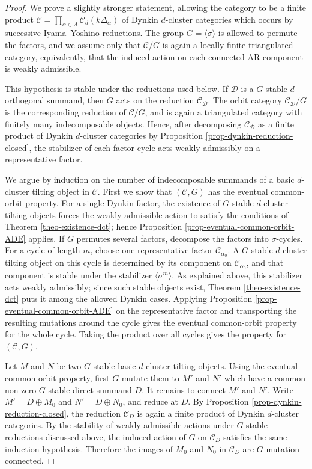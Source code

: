 \documentclass[12pt]{article}
\theoremstyle{plain}
\theoremstyle{definition}
\begin{document}
\begin{proof}
We prove a slightly stronger statement, allowing the category to be a finite
product \(\mathcal C=\prod_{\alpha\in A}\mathcal C_d(k\Delta_\alpha)\) of
Dynkin \(d\)-cluster categories which occurs by successive Iyama--Yoshino
reductions.  The group \(G=\langle\sigma\rangle\) is allowed to permute the
factors, and we assume only that \(\mathcal C/G\) is again a locally finite
triangulated category, equivalently, that the induced action on each connected
AR-component is weakly admissible.

This hypothesis is stable under the reductions used below.  If \(\mathcal D\)
is a \(G\)-stable \(d\)-orthogonal summand, then \(G\) acts on the reduction
\(\mathcal C_{\mathcal D}\).  The orbit category
\(\mathcal C_{\mathcal D}/G\) is the corresponding reduction of
\(\mathcal C/G\), and is again a triangulated category with finitely many
indecomposable objects.  Hence, after decomposing \(\mathcal C_{\mathcal D}\)
as a finite product of Dynkin \(d\)-cluster categories by Proposition
\ref{prop-dynkin-reduction-closed}, the stabilizer of each factor cycle acts
weakly admissibly on a representative factor. 

We argue by induction on the number of indecomposable summands of a basic
\(d\)-cluster tilting object in \(\mathcal C\).  First we show that
\((\mathcal C,G)\) has the eventual common-orbit property.  For a single Dynkin
factor, the existence of \(G\)-stable \(d\)-cluster tilting objects forces the
weakly admissible action to satisfy the conditions of Theorem
\ref{theo-existence-dct}; hence Proposition
\ref{prop-eventual-common-orbit-ADE} applies.  If \(G\) permutes several
factors, decompose the factors into \(\sigma\)-cycles.  For a cycle of length
\(m\), choose one representative factor \(\mathcal C_{\alpha_0}\).  A
\(G\)-stable \(d\)-cluster tilting object on this cycle is determined by its
component on \(\mathcal C_{\alpha_0}\), and that component is stable under the
stabilizer \(\langle\sigma^m\rangle\).  As explained above, this stabilizer
acts weakly admissibly; since such stable objects exist, Theorem
\ref{theo-existence-dct} puts it among the allowed Dynkin cases.  Applying
Proposition \ref{prop-eventual-common-orbit-ADE} on the representative factor
and transporting the resulting mutations around the cycle gives the eventual
common-orbit property for the whole cycle.  Taking the product over all cycles
gives the property for \((\mathcal C,G)\).

Let \(M\) and \(N\) be two \(G\)-stable basic \(d\)-cluster tilting objects.
Using the eventual common-orbit property, first \(G\)-mutate them to
\(M'\) and \(N'\) which have a common non-zero \(G\)-stable direct summand
\(D\).  It remains to connect \(M'\) and \(N'\).  Write
\(M'=D\oplus M_0\) and \(N'=D\oplus N_0\), and reduce at \(D\).  By Proposition
\ref{prop-dynkin-reduction-closed}, the reduction \(\mathcal C_D\) is again a
finite product of Dynkin \(d\)-cluster categories.  By the stability of
weakly admissible actions under \(G\)-stable reductions discussed above, the
induced action of \(G\) on \(\mathcal C_D\) satisfies the same induction
hypothesis.  Therefore the images of \(M_0\) and \(N_0\) in \(\mathcal C_D\)
are \(G\)-mutation connected.


\end{proof}
\end{document}
